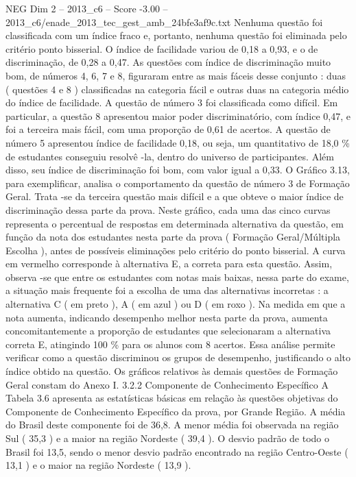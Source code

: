 \begin{textsample}{NEG Dim 2 – 2013\_c6 – Score -3.00 – 2013\_c6/enade\_2013\_tec\_gest\_amb\_24bfe3af9c.txt}
Nenhuma questão foi classificada com um índice fraco e, portanto, nenhuma questão foi eliminada pelo critério ponto bisserial.
O índice de facilidade variou de 0,18 a 0,93, e o de discriminação, de 0,28 a 0,47.
As questões com índice de discriminação muito bom, de números 4, 6, 7 e 8, figuraram entre as mais fáceis desse conjunto : duas ( questões 4 e 8 ) classificadas na categoria fácil e outras duas na categoria médio do índice de facilidade.
A questão de número 3 foi classificada como difícil.
Em particular, a questão 8 apresentou maior poder discriminatório, com índice 0,47, e foi a terceira mais fácil, com uma proporção de 0,61 de acertos.
A questão de número 5 apresentou índice de facilidade 0,18, ou seja, um quantitativo de 18,0 \% de estudantes conseguiu resolvê -la, dentro do universo de participantes.
Além disso, seu índice de discriminação foi bom, com valor igual a 0,33.
O Gráfico 3.13, para exemplificar, analisa o comportamento da questão de número 3 de Formação Geral.
Trata -se da terceira questão mais difícil e a que obteve o maior índice de discriminação dessa parte da prova.
Neste gráfico, cada uma das cinco curvas representa o percentual de respostas em determinada alternativa da questão, em função da nota dos estudantes nesta parte da prova ( Formação Geral/Múltipla Escolha ), antes de possíveis eliminações pelo critério do ponto bisserial.
A curva em vermelho corresponde à alternativa E, a correta para esta questão.
Assim, observa -se que entre os estudantes com notas mais baixas, nessa parte do exame, a situação mais frequente foi a escolha de uma das alternativas incorretas : a alternativa C ( em preto ), A ( em azul ) ou D ( em roxo ).
Na medida em que a nota aumenta, indicando desempenho melhor nesta parte da prova, aumenta concomitantemente a proporção de estudantes que selecionaram a alternativa correta E, atingindo 100 \% para os alunos com 8 acertos.
Essa análise permite verificar como a questão discriminou os grupos de desempenho, justificando o alto índice obtido na questão.
Os gráficos relativos às demais questões de Formação Geral constam do Anexo I. 3.2.2 Componente de Conhecimento Específico A Tabela 3.6 apresenta as estatísticas básicas em relação às questões objetivas do Componente de Conhecimento Específico da prova, por Grande Região.
A média do Brasil deste componente foi de 36,8.
A menor média foi observada na região Sul ( 35,3 ) e a maior na região Nordeste ( 39,4 ).
O desvio padrão de todo o Brasil foi 13,5, sendo o menor desvio padrão encontrado na região Centro-Oeste ( 13,1 ) e o maior na região Nordeste ( 13,9 ).

\end{textsample}
